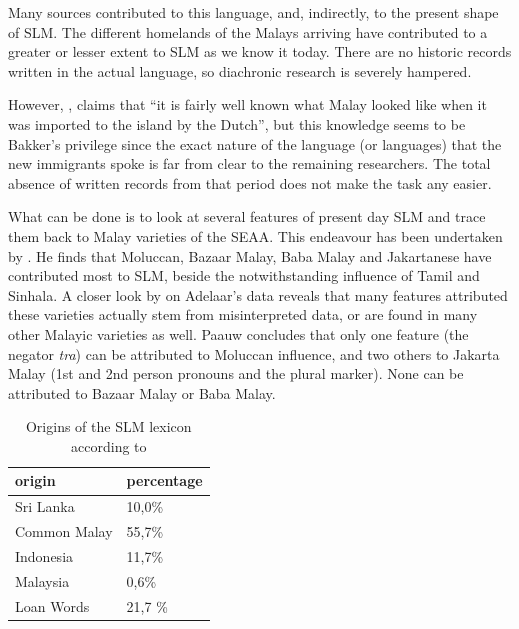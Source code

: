 Many sources  contributed to this language, and, indirectly, to the present shape of SLM. The
different homelands of the Malays arriving have contributed to a
greater or lesser extent to SLM as we know it today. There are no
historic records written in the actual language, so diachronic
research is severely hampered.

However, \citet[17]{Bakker1996stuf}, \citet[139]{Bakker2006} claims that  ``it is fairly well known what Malay looked like  when it was imported to the island by the Dutch'', but this knowledge seems to be Bakker's privilege since the exact nature of the language (or languages) that the new immigrants spoke is far from clear to the remaining researchers. The total absence of written records from that period does not make the task any easier.

 What can be done is to look at
several features of present day SLM and trace them back to Malay
varieties of the SEAA. This endeavour has been undertaken by
\citet{Adelaar1991}. He finds that Moluccan, Bazaar Malay, Baba
Malay and Jakartanese have contributed most to SLM, beside the
notwithstanding influence of Tamil and Sinhala. A closer look by
\citet{Paauw2004} on Adelaar's data reveals that many features
attributed these varieties actually stem from misinterpreted data,
or are found in many other Malayic varieties as well. Paauw
concludes that only one feature (the negator \textit{t\E ra}) can
be attributed to Moluccan influence, and two others to Jakarta
Malay (1st and 2nd person pronouns and the plural marker). None
can be attributed to Bazaar Malay or Baba Malay.

\begin{table}
    \centering
        \begin{tabular}{l|l}
                        origin      & percentage\\
                        \hline
                        Sri Lanka &       10,0\% \\
                        Common Malay &    55,7\% \\
                        Indonesia &       11,7\% \\
                        Malaysia &        0,6\% \\
                        Loan Words &      21,7 \% \\
        \end{tabular}
    \caption{Origins of the SLM lexicon according to \citet{Paauw2004}}
    \label{tab:originsOfTheSLMLexicon}
\end{table}


